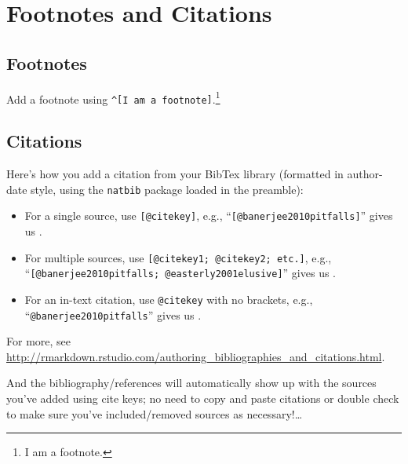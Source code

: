 \documentclass[11pt,]{article}
\providecommand{\tightlist}{%
  \setlength{\itemsep}{0pt}\setlength{\parskip}{0pt}}
\let\rmarkdownfootnote\footnote%
\def\footnote{\protect\rmarkdownfootnote}
\begin{document}
\section{Footnotes and Citations}\label{footnotes-and-citations}

\subsection{Footnotes}\label{footnotes}

Add a footnote using \texttt{\^{}{[}I\ am\ a\ footnote{]}}.\footnote{I
  am a footnote.}

\subsection{Citations}\label{citations}

Here's how you add a citation from your BibTex library (formatted in
author-date style, using the \texttt{natbib} package loaded in the
preamble):

\begin{itemize}
\tightlist
\item
  For a single source, use \texttt{{[}@citekey{]}}, e.g.,
  ``\texttt{{[}@banerjee2010pitfalls{]}}'' gives us
  \citep{banerjee2010pitfalls}.
\item
  For multiple sources, use \texttt{{[}@citekey1;\ @citekey2;\ etc.{]}},
  e.g., ``\texttt{{[}@banerjee2010pitfalls;\ @easterly2001elusive{]}}''
  gives us \citep{banerjee2010pitfalls, easterly2001elusive}.
\item
  For an in-text citation, use \texttt{@citekey} with no brackets, e.g.,
  ``\texttt{@banerjee2010pitfalls}'' gives us
  \citet{banerjee2010pitfalls}.
\end{itemize}

For more, see
\url{http://rmarkdown.rstudio.com/authoring_bibliographies_and_citations.html}.

And the bibliography/references will automatically show up with the
sources you've added using cite keys; no need to copy and paste
citations or double check to make sure you've included/removed sources
as necessary!\ldots{}


\end{document}
